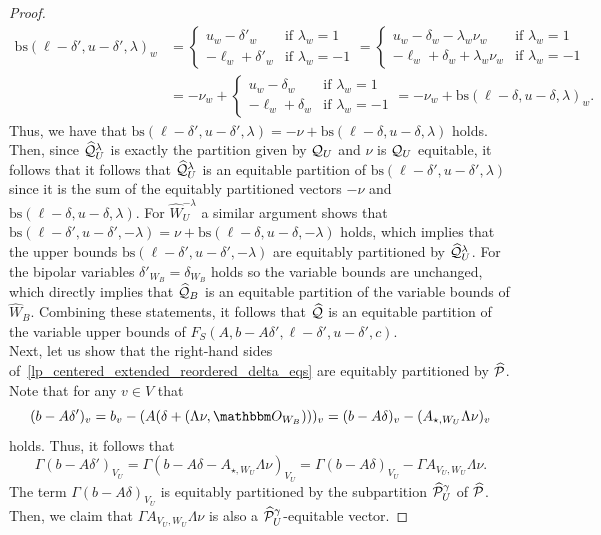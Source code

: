 \documentclass[pdflatex,sn-mathphys-num]{sn-jnl}%
\theoremstyle{thmstyleone}%
\theoremstyle{thmstylethree}%
\theoremstyle{thmstyletwo}%
\begin{document}
\begin{proof}
\begin{align*}
        \mathrm{bs}(\ell-\delta',u-\delta',\lambda)_w &= \begin{cases}
            u_w - \delta'_w&\text{if }\lambda_w=1\\
            -\ell_w + \delta'_w&\text{if }\lambda_w=-1
        \end{cases} = \begin{cases}
            u_w - \delta_w - \lambda_w \nu_w &\text{if }\lambda_w=1\\
            -\ell_w + \delta_w + \lambda_w \nu_w &\text{if }\lambda_w=-1
        \end{cases}\\ &= - \nu_w + \begin{cases}
            u_w - \delta_w&\text{if }\lambda_w=1\\
            -\ell_w + \delta_w&\text{if }\lambda_w=-1
        \end{cases}= - \nu_w +  \mathrm{bs}(\ell-\delta,u-\delta,\lambda)_w.
    \end{align*}
    Thus, we have that $\mathrm{bs}(\ell-\delta',u-\delta',\lambda) = -\nu + \mathrm{bs}(\ell-\delta,u-\delta,\lambda)$ holds.  
    Then, since $\widehat{\mathcal{Q}}^\lambda_U$ is exactly the partition given by $\mathcal{Q}_U$ and $\nu$ is $\mathcal{Q}_U$ equitable, it follows that it follows that $\widehat{\mathcal{Q}}^\lambda_U$ is an equitable partition of $\mathrm{bs}(\ell-\delta',u-\delta',\lambda)$ since it is the sum of the equitably partitioned vectors $-\nu$ and $\mathrm{bs}(\ell-\delta,u-\delta,\lambda)$.
    For $\widehat{W}^{-\lambda}_U$ a similar argument shows that $\mathrm{bs}(\ell-\delta',u-\delta', -\lambda) = \nu + \mathrm{bs}(\ell-\delta,u-\delta,-\lambda)$ holds, which implies that the upper bounds $\mathrm{bs}(\ell-\delta',u-\delta', -\lambda)$ are equitably partitioned by $\widehat{\mathcal{Q}}^\lambda_U$. For the bipolar variables $\delta'_{W_B} = \delta_{W_B}$ holds so the variable bounds are unchanged, which directly implies that $\widehat{\mathcal{Q}}_B$ is an equitable partition of the variable bounds of $\widehat{W}_B$. Combining these statements, it follows that $\widehat{\mathcal{Q}}$ is an equitable partition of the variable upper bounds of $F_S(A,b-A\delta',\ell-\delta',u-\delta',c)$.\\

    Next, let us show that the right-hand sides of~\eqref{lp_centered_extended_reordered_delta_eqs} are equitably partitioned by $\widehat{\mathcal{P}}$. Note that for any $v\in V$ that 
    \begin{equation*}
        (b- A \delta')_v = b_v - (A (\delta + (\Lambda\nu,\zerovec_{W_B})))_v =(b- A\delta)_v - (A_{\star,W_U} \Lambda \nu)_v
    \end{equation*} holds. Thus, it follows that 
    \begin{equation*}
        \Gamma(b- A \delta')_{V_U} = \Gamma(b- A \delta - A_{\star,W_U} \Lambda \nu )_{V_U} = \Gamma(b-A \delta)_{V_U} - \Gamma A_{V_U,W_U} \Lambda \nu.
    \end{equation*} 
    The term $\Gamma(b-A \delta)_{V_U}$ is equitably partitioned by the subpartition $\widehat{\mathcal{P}}^\gamma_U$ of $\widehat{\mathcal{P}}$. Then, we claim that 
    $\Gamma A_{V_U,W_U} \Lambda \nu$ is also a $\widehat{\mathcal{P}}^\gamma_U$-equitable vector.
    

\end{proof}
\end{document}
